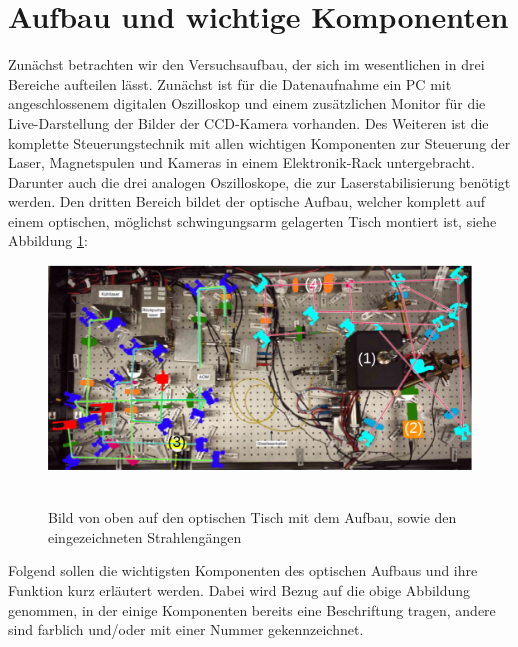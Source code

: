 \documentclass[twoside,colorback,accentcolor=tud4c,11pt]{tudreport}
\begin{document}
\section{Aufbau und wichtige Komponenten}
Zunächst betrachten wir den Versuchsaufbau, der sich im wesentlichen in drei Bereiche aufteilen lässt. Zunächst ist für die Datenaufnahme ein PC mit angeschlossenem digitalen Oszilloskop und einem zusätzlichen Monitor für die Live-Darstellung der Bilder der CCD-Kamera vorhanden. Des Weiteren ist die komplette Steuerungstechnik mit allen wichtigen Komponenten zur Steuerung der Laser, Magnetspulen und Kameras in einem Elektronik-Rack untergebracht. Darunter auch die drei analogen Oszilloskope, die zur Laserstabilisierung benötigt werden. Den dritten Bereich bildet der optische Aufbau, welcher komplett auf einem optischen, möglichst schwingungsarm gelagerten Tisch montiert ist, siehe Abbildung \ref{aufb}:
\begin{figure}[H]
\centering
   	\begin{minipage}[b]{0.85\textwidth}
   	\includegraphics[width=\textwidth]{graphics/aufbau2.png}\
   	\end{minipage}
\caption{Bild von oben auf den optischen Tisch mit dem Aufbau, sowie den eingezeichneten Strahlengängen \cite{anl}}\label{aufb}	
\end{figure}
Folgend sollen die wichtigsten Komponenten des optischen Aufbaus und ihre Funktion kurz erläutert werden. Dabei wird Bezug auf die obige Abbildung genommen, in der einige Komponenten bereits eine Beschriftung tragen, andere sind farblich und/oder mit einer Nummer gekennzeichnet.
\end{document}
